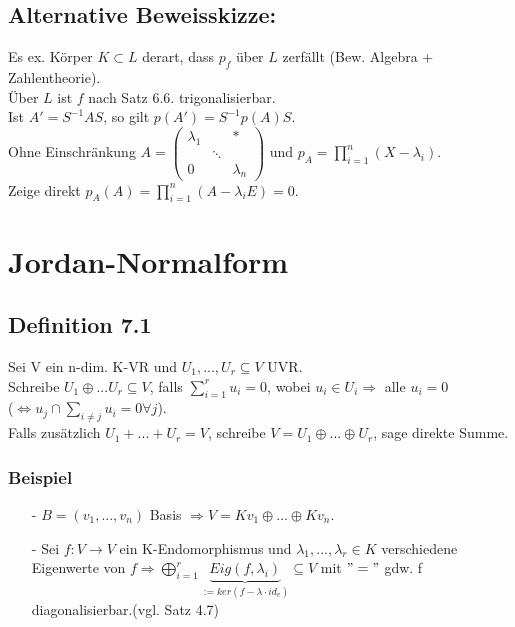 \documentclass[a4paper, 12pt]{extarticle}
\begin{document}
\subsection*{Alternative Beweisskizze:}
Es ex. Körper $K \subset L$ derart, dass $p_f$ über $L$ zerfällt (Bew. Algebra + Zahlentheorie).\\
Über $L$ ist $f$ nach Satz 6.6. trigonalisierbar.\\
Ist $A' = S^{-1}AS$, so gilt $p(A') = S^{-1}p(A)S$.\\
Ohne Einschränkung $A = \left(\begin{matrix}
	\lambda_1 &  & *\\
	 & \ddots & \\
	0 & & \lambda_n
\end{matrix}\right)$ und $p_A = \prod_{i=1}^{n}(X-\lambda_i)$.\\
Zeige direkt $p_A(A) = \prod_{i=1}^{n}(A-\lambda_iE) = 0$.
\section{Jordan-Normalform}
\subsection*{Definition 7.1}
Sei V ein n-dim. K-VR und $U_1, ..., U_r \subseteq V$ UVR.\\
Schreibe $U_1 \oplus ... U_r \subseteq V$,
falls $\sum_{i=1}^{r} u_i = 0$, wobei  $u_i \in U_i \Rightarrow$ alle $u_i = 0$\\
($\Leftrightarrow u_j \cap \sum_{i \neq j}u_i = {0}  \forall j$).\\
Falls zusätzlich $U_1 + ... + U_r = V$, schreibe $V = U_1 \oplus ... \oplus U_r$, sage direkte Summe.
\subsubsection*{Beispiel}
\begin{itemize}
\item[-]
$B = (v_1, ..., v_n)$ Basis $\Rightarrow V = Kv_1 \oplus ... \oplus Kv_n$.
\item[-]
Sei $f: V \rightarrow V$ ein K-Endomorphismus und $\lambda_1 , ... , \lambda_r \in K$ verschiedene Eigenwerte von $f \Rightarrow  \bigoplus_{i=1}^{r} \underbrace{Eig(f, \lambda_i)}_{:= ker(f-\lambda \cdot id_v)} \subseteq
 V$ mit $"="$ gdw. f diagonalisierbar.(vgl. Satz 4.7)
\end{itemize}
\end{document}

